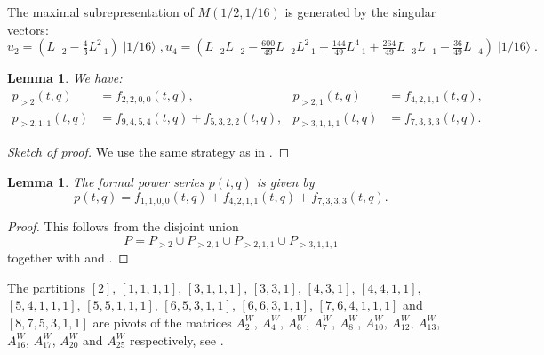 \documentclass[a4paper, 12pt, reqno]{amsart}
\newtheorem{lemma}[theorem]{Lemma}
\theoremstyle{remark}
\DeclareMathOperator{\vacsixteen}{|1/16\rangle}
\begin{document}
The maximal subrepresentation of $M(1/2, 1/16)$ is generated by the singular vectors:
\begin{equation*}
  u_2 = (L_{-2} - \tfrac{4}{3}L_{-1}^2)\vacsixteen, u_4 = (L_{-2}L_{-2} - \tfrac{600}{49}L_{-2}L_{-1}^2 + \tfrac{144}{49}L_{-1}^4 + \tfrac{264}{49}L_{-3}L_{-1} - \tfrac{36}{49}L_{-4})\vacsixteen.
\end{equation*}

\begin{lemma}
  \label{lmm:12}
  We have:
  \begin{align*}
    p_{>2}(t, q) &= f_{2, 2, 0, 0}(t, q), &p_{>2, 1}(t, q) &= f_{4, 2, 1, 1}(t, q), \\
    p_{>2, 1, 1}(t, q) &= f_{9, 4, 5, 4}(t, q) + f_{5, 3, 2, 2}(t, q), &p_{>3, 1, 1, 1}(t, q) &= f_{7, 3, 3, 3}(t, q).
  \end{align*}
\end{lemma}

\begin{proof}[Sketch of proof]
  We use the same strategy as in .
\end{proof}

\begin{lemma}
  \label{lmm:13}
  The formal power series $p(t, q)$ is given by
  \begin{equation*}
    p(t, q) = f_{1, 1, 0, 0}(t, q) + f_{4, 2, 1, 1}(t, q) + f_{7, 3, 3, 3}(t, q).
  \end{equation*}
\end{lemma}

\begin{proof}
  This follows from the disjoint union
  \begin{equation*}
    P = P_{>2} \cup P_{>2, 1} \cup P_{>2, 1, 1} \cup P_{>3, 1, 1, 1}
  \end{equation*}
  together with  and .
\end{proof}

The partitions $[2]$, $[1, 1, 1, 1]$, $[3, 1, 1, 1]$, $[3, 3, 1]$, $[4, 3, 1]$, $[4, 4, 1, 1]$, $[5, 4, 1, 1, 1]$, $[5, 5, 1, 1, 1]$, $[6, 5, 3, 1, 1]$, $[6, 6, 3, 1, 1]$, $[7, 6, 4, 1, 1, 1]$ and $[8, 7, 5, 3, 1, 1]$ are pivots of the matrices $A^W_2$, $A^W_4$, $A^W_6$, $A^W_7$, $A^W_8$, $A^W_{10}$, $A^W_{12}$, $A^W_{13}$, $A^W_{16}$, $A^W_{17}$, $A^W_{20}$ and $A^W_{25}$ respectively, see \cite[ising-modules-1-16.ipynb]{sagemath2}.



\end{document}
